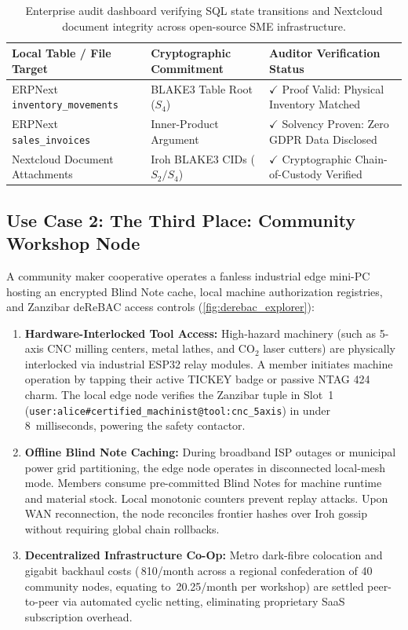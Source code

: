 \documentclass[a4paper,11pt,twoside,parskip=half-,headings=small]{scrartcl}
\newcommand{\EUR}[1]{\texteuro\,#1}
\newcommand{\code}[1]{\texttt{#1}}
\begin{document}
\begin{table}[H]
\centering\small
\renewcommand{\arraystretch}{1.2}
\begin{tabularx}{0.95\linewidth}{@{}l L{4.5cm} Y@{}}
\toprule
\textbf{Local Table / File Target} & \textbf{Cryptographic Commitment} & \textbf{Auditor Verification Status}\\
\midrule
ERPNext \code{inventory\_movements} & BLAKE3 Table Root ($S_4$) & $\checkmark$ Proof Valid: Physical Inventory Matched\\
ERPNext \code{sales\_invoices} & Inner-Product Argument & $\checkmark$ Solvency Proven: Zero GDPR Data Disclosed\\
Nextcloud Document Attachments & Iroh BLAKE3 CIDs ($S_2/S_4$) & $\checkmark$ Cryptographic Chain-of-Custody Verified\\
\bottomrule
\end{tabularx}
\caption{Enterprise audit dashboard verifying SQL state transitions and Nextcloud document integrity across open-source SME infrastructure.}
\label{tab:sql_dashboard}
\end{table}

\subsection{Use Case 2: The Third Place: Community Workshop Node}

A community maker cooperative operates a fanless industrial edge mini-PC hosting an
encrypted Blind Note cache, local machine authorization registries, and Zanzibar deReBAC
access controls (\cref{fig:derebac_explorer}):
\begin{enumerate}
  \item \textbf{Hardware-Interlocked Tool Access:} High-hazard machinery (such as 5-axis CNC
milling centers, metal lathes, and CO$_2$ laser cutters) are physically interlocked via
industrial ESP32 relay modules. A member initiates machine operation by tapping their
active TICKEY badge or passive NTAG 424 charm. The local edge node verifies the
Zanzibar tuple in Slot~1 (\code{user:alice\#certified\_machinist@tool:cnc\_5axis}) in
under 8~milliseconds, powering the safety contactor.
  \item \textbf{Offline Blind Note Caching:} During broadband ISP outages or municipal power
grid partitioning, the edge node operates in disconnected local-mesh mode. Members
consume pre-committed Blind Notes for machine runtime and material stock. Local monotonic
counters prevent replay attacks. Upon WAN reconnection, the node reconciles frontier
hashes over Iroh gossip without requiring global chain rollbacks.
  \item \textbf{Decentralized Infrastructure Co-Op:} Metro dark-fibre colocation and gigabit
backhaul costs (\EUR{810}/month across a regional confederation of 40 community nodes,
equating to \EUR{20.25}/month per workshop) are settled peer-to-peer via automated
cyclic netting, eliminating proprietary SaaS subscription overhead.
\end{enumerate}
\end{document}
